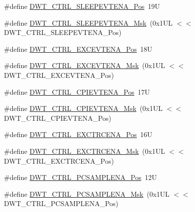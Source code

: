 \begin{DoxyCompactItemize}
\item 
\#define \mbox{\hyperlink{group___c_m_s_i_s___d_w_t_ga9c6d62d121164013a8e3ee372f17f3e5}{D\+W\+T\+\_\+\+C\+T\+R\+L\+\_\+\+S\+L\+E\+E\+P\+E\+V\+T\+E\+N\+A\+\_\+\+Pos}}~19U
\item 
\#define \mbox{\hyperlink{group___c_m_s_i_s___d_w_t_ga2f431b3734fb840daf5b361034856da9}{D\+W\+T\+\_\+\+C\+T\+R\+L\+\_\+\+S\+L\+E\+E\+P\+E\+V\+T\+E\+N\+A\+\_\+\+Msk}}~(0x1\+U\+L $<$$<$ D\+W\+T\+\_\+\+C\+T\+R\+L\+\_\+\+S\+L\+E\+E\+P\+E\+V\+T\+E\+N\+A\+\_\+\+Pos)
\item 
\#define \mbox{\hyperlink{group___c_m_s_i_s___d_w_t_gaf4e73f548ae3e945ef8b1d9ff1281544}{D\+W\+T\+\_\+\+C\+T\+R\+L\+\_\+\+E\+X\+C\+E\+V\+T\+E\+N\+A\+\_\+\+Pos}}~18U
\item 
\#define \mbox{\hyperlink{group___c_m_s_i_s___d_w_t_gab7ee0def33423b5859ca4030dff63b58}{D\+W\+T\+\_\+\+C\+T\+R\+L\+\_\+\+E\+X\+C\+E\+V\+T\+E\+N\+A\+\_\+\+Msk}}~(0x1\+U\+L $<$$<$ D\+W\+T\+\_\+\+C\+T\+R\+L\+\_\+\+E\+X\+C\+E\+V\+T\+E\+N\+A\+\_\+\+Pos)
\item 
\#define \mbox{\hyperlink{group___c_m_s_i_s___d_w_t_ga9fff0b71fb0be1499f5180c6bce1fc8f}{D\+W\+T\+\_\+\+C\+T\+R\+L\+\_\+\+C\+P\+I\+E\+V\+T\+E\+N\+A\+\_\+\+Pos}}~17U
\item 
\#define \mbox{\hyperlink{group___c_m_s_i_s___d_w_t_ga189089c30aade60b983df17ad2412f6f}{D\+W\+T\+\_\+\+C\+T\+R\+L\+\_\+\+C\+P\+I\+E\+V\+T\+E\+N\+A\+\_\+\+Msk}}~(0x1\+U\+L $<$$<$ D\+W\+T\+\_\+\+C\+T\+R\+L\+\_\+\+C\+P\+I\+E\+V\+T\+E\+N\+A\+\_\+\+Pos)
\item 
\#define \mbox{\hyperlink{group___c_m_s_i_s___d_w_t_ga05f13b547a9a1e63e003ee0bc6446d0d}{D\+W\+T\+\_\+\+C\+T\+R\+L\+\_\+\+E\+X\+C\+T\+R\+C\+E\+N\+A\+\_\+\+Pos}}~16U
\item 
\#define \mbox{\hyperlink{group___c_m_s_i_s___d_w_t_gaf4fbb509ab3cbb768f16484c660a24c3}{D\+W\+T\+\_\+\+C\+T\+R\+L\+\_\+\+E\+X\+C\+T\+R\+C\+E\+N\+A\+\_\+\+Msk}}~(0x1\+U\+L $<$$<$ D\+W\+T\+\_\+\+C\+T\+R\+L\+\_\+\+E\+X\+C\+T\+R\+C\+E\+N\+A\+\_\+\+Pos)
\item 
\#define \mbox{\hyperlink{group___c_m_s_i_s___d_w_t_ga1e14afc7790fcb424fcf619e192554c9}{D\+W\+T\+\_\+\+C\+T\+R\+L\+\_\+\+P\+C\+S\+A\+M\+P\+L\+E\+N\+A\+\_\+\+Pos}}~12U
\item 
\#define \mbox{\hyperlink{group___c_m_s_i_s___d_w_t_gafdcf1c86f43fbeaf2780ce797c9ef3d6}{D\+W\+T\+\_\+\+C\+T\+R\+L\+\_\+\+P\+C\+S\+A\+M\+P\+L\+E\+N\+A\+\_\+\+Msk}}~(0x1\+U\+L $<$$<$ D\+W\+T\+\_\+\+C\+T\+R\+L\+\_\+\+P\+C\+S\+A\+M\+P\+L\+E\+N\+A\+\_\+\+Pos)
\item 
$$
\end{DoxyCompactItemize}
